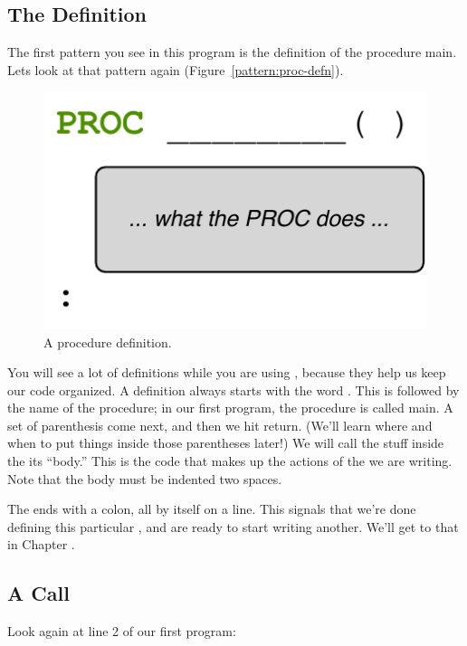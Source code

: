 \subsection{The \PROCedure Definition}
The first pattern you see in this program is the definition of the procedure {\code main}. Lets look at that pattern again (Figure~\vref{pattern:proc-defn}).

\begin{figure}[h]
  \begin{center}
    \includegraphics[scale=1.0]{images/proc-defn-pattern}
    \caption{A procedure definition.}
    \label{pattern:proc-defn}
  \end{center}
\end{figure}

You will see a lot of \PROCedure definitions while you are using \plumbing, because they help us keep our code organized. A \PROCedure definition always starts with the word \PROC. This is followed by the name of the procedure; in our first program, the procedure is called {\code main}. A set of parenthesis come next, and then we hit return. (We'll learn where and when to put things inside those parentheses later!) We will call the stuff inside the \PROCedure its ``body.'' This is the code that makes up the actions of the \PROC we are writing. Note that the body must be indented two spaces. 

The \PROC ends with a colon, all by itself on a line. This signals that we're done defining this particular \PROC, and are ready to start writing another. We'll get to that in Chapter \XXX.

\subsection{A \PROCedure Call}
Look again at line 2 of our first program:

